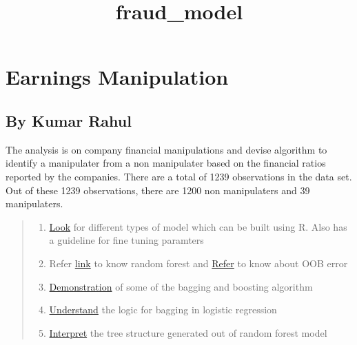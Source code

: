 \documentclass[11pt]{article}
\title{fraud\_model}
\providecommand{\tightlist}{%
      \setlength{\itemsep}{0pt}\setlength{\parskip}{0pt}}
\begin{document}
    
    
    \maketitle
    
    

    
    \hypertarget{earnings-manipulation}{%
\section{Earnings Manipulation}\label{earnings-manipulation}}

\hypertarget{by-kumar-rahul}{%
\subsection{By Kumar Rahul}\label{by-kumar-rahul}}

The analysis is on company financial manipulations and devise algorithm
to identify a manipulater from a non manipulater based on the financial
ratios reported by the companies. There are a total of 1239 observations
in the data set. Out of these 1239 observations, there are 1200 non
manipulaters and 39 manipulaters.

\begin{quote}
\begin{enumerate}
\def\labelenumi{\arabic{enumi}.}
\tightlist
\item
  \href{http://topepo.github.io/caret/train-models-by-tag.html}{Look}
  for different types of model which can be built using R. Also has a
  guideline for fine tuning paramters
\item
  Refer
  \href{http://stats.stackexchange.com/questions/163799/training-a-random-forest-in-r-with-a-maximum-false-positive-rate}{link}
  to know random forest and
  \href{http://stackoverflow.com/questions/18541923/what-is-out-of-bag-error-in-random-forests}{Refer}
  to know about OOB error
\item
  \href{https://rpubs.com/chengjiun/52658}{Demonstration} of some of the
  bagging and boosting algorithm
\item
  \href{https://www.r-bloggers.com/improve-predictive-performance-in-r-with-bagging/}{Understand}
  the logic for bagging in logistic regression
\item
  \href{http://stackoverflow.com/questions/14996619/random-forest-output-interpretation}{Interpret}
  the tree structure generated out of random forest model
\end{enumerate}
\end{quote}
\end{document}
